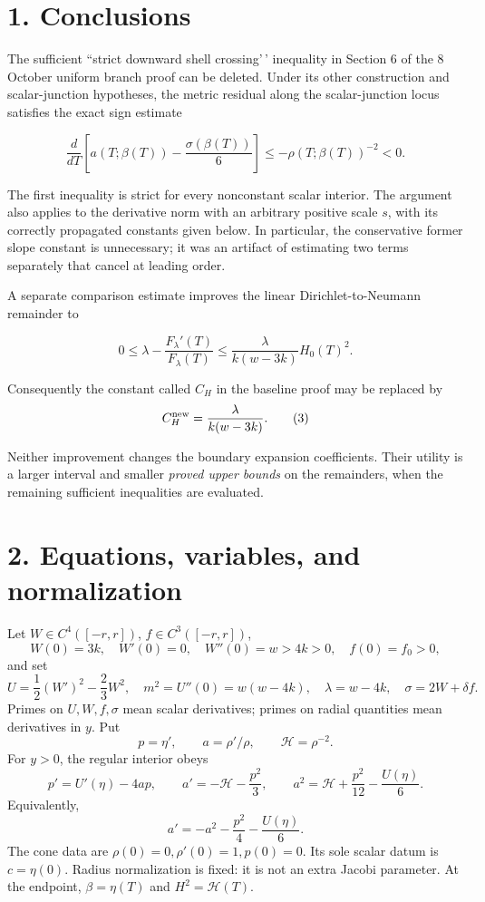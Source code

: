 \documentclass[11pt]{article}
\begin{document}
\section{1. Conclusions}\label{conclusions}

The sufficient ``strict downward shell crossing'\,' inequality in Section 6 of
the 8 October uniform branch proof can be deleted. Under its other construction
and scalar-junction hypotheses, the metric residual along the scalar-junction
locus satisfies the exact sign estimate

\[
 \frac{d}{dT}\left[a(T;\beta(T))-\frac{\sigma(\beta(T))}{6}\right]
 \leq -\rho(T;\beta(T))^{-2}<0.                       \tag{1}
\]

The first inequality is strict for every nonconstant scalar interior. The
argument also applies to the derivative norm with an arbitrary positive scale
\(s\), with its correctly propagated constants given below. In particular,
the conservative former slope constant is unnecessary; it was an artifact of
estimating two terms separately that cancel at leading order.

A separate comparison estimate improves the linear Dirichlet-to-Neumann
remainder to

\[
 0\leq\lambda-\frac{F_\lambda'(T)}{F_\lambda(T)}
 \leq\frac{\lambda}{k(w-3k)}H_0(T)^2.               \tag{2}
\]

Consequently the constant called \(C_H\) in the baseline proof may be replaced by
\[
 C_H^{\rm new}=\frac{\lambda}{k(w-3k)}.             \tag{3}
\]

Neither improvement changes the boundary expansion coefficients. Their utility
is a larger interval and smaller \emph{proved upper bounds} on the remainders, when
the remaining sufficient inequalities are evaluated.

\section{2. Equations, variables, and normalization}\label{equations-variables-and-normalization}

Let \(W\in C^4([-r,r])\), \(f\in C^3([-r,r])\),
\[
 W(0)=3k,\quad W'(0)=0,\quad W''(0)=w>4k>0,
 \quad f(0)=f_0>0,
\]
and set
\[
 U=\frac12(W')^2-\frac23W^2,\quad
 m^2=U''(0)=w(w-4k),\quad\lambda=w-4k,\quad
 \sigma=2W+\delta f.
\]
Primes on \(U,W,f,\sigma\) mean scalar derivatives; primes on radial quantities
mean derivatives in \(y\). Put
\[
 p=\eta',\qquad a=\rho'/\rho,\qquad \mathcal H=\rho^{-2}.
\]
For \(y>0\), the regular interior obeys
\[
 p'=U'(\eta)-4ap,\qquad
 a'=-\mathcal H-\frac{p^2}{3},\qquad
 a^2=\mathcal H+\frac{p^2}{12}-\frac{U(\eta)}6.       \tag{4}
\]
Equivalently,
\[
 a'=-a^2-\frac{p^2}{4}-\frac{U(\eta)}6.             \tag{5}
\]
The cone data are \(\rho(0)=0,\rho'(0)=1,p(0)=0\). Its sole scalar datum is
\(c=\eta(0)\). Radius normalization is fixed: it is not an extra Jacobi parameter.
At the endpoint, \(\beta=\eta(T)\) and \(H^2=\mathcal H(T)\).
\end{document}

